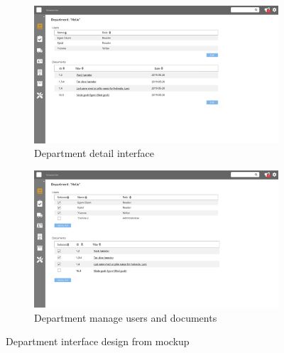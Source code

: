 \begin{figure}[H]\ContinuedFloat
	\centering
	\begin{subfigure}[b]{0.48\textwidth}
		\includegraphics[width=\textwidth]{billeder/iteration3Prototyper/Page_25.jpg}
		\caption{Department detail interface}
		\label{fig:5-DepDetail}
	\end{subfigure}
	\quad
	\begin{subfigure}[b]{0.48\textwidth}
		\includegraphics[width=\textwidth]{billeder/iteration3Prototyper/Page_26.jpg}
		\caption{Department manage users and documents}
		\label{fig:5-DepEdit}
	\end{subfigure}
	\caption{Department interface design from mockup}\label{fig:5-DepMockUp}
\end{figure}

\newpage
